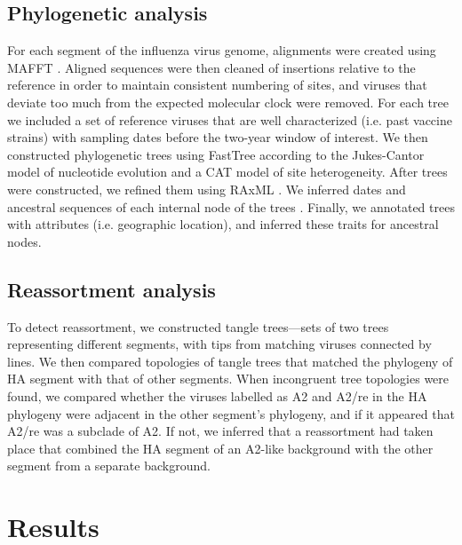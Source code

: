 \subsection*{Phylogenetic analysis}
For each segment of the influenza virus genome, alignments were created using MAFFT \citep{katoh_mafft_2013}.
Aligned sequences were then cleaned of insertions relative to the reference in order to maintain consistent numbering of sites, and viruses that deviate too much from the expected molecular clock were removed.
For each tree we included a set of reference viruses that are well characterized (i.e. past vaccine strains) with sampling dates before the two-year window of interest.
We then constructed phylogenetic trees using FastTree \citep{price_fasttree_2009} according to the Jukes-Cantor model of nucleotide evolution and a CAT model of site heterogeneity.
After trees were constructed, we refined them using RAxML \citep{stamatakis_raxml_2014}.
We inferred dates and ancestral sequences of each internal node of the trees \citep{Sagulenko2018}.
Finally, we annotated trees with attributes (i.e. geographic location), and inferred these traits for ancestral nodes.

\subsection*{Reassortment analysis}
To detect reassortment, we constructed tangle trees—sets of two trees representing different segments, with tips from matching viruses connected by lines.
We then compared topologies of tangle trees that matched the phylogeny of HA segment with that of other segments.
When incongruent tree topologies were found, we compared whether the viruses labelled as A2 and A2/re in the HA phylogeny were adjacent in the other segment’s phylogeny, and if it appeared that A2/re was a subclade of A2.
If not, we inferred that a reassortment had taken place that combined the HA segment of an A2-like background with the other segment from a separate background.

\section*{Results}

